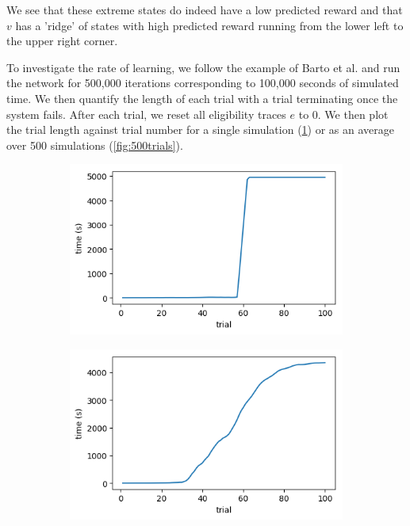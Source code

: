 \documentclass{article}
\begin{document}
We see that these extreme states do indeed have a low predicted reward and that $v$ has a 'ridge' of states with high predicted reward running from the lower left to the upper right corner.

To investigate the rate of learning, we follow the example of Barto et al. and run the network for 500,000 iterations corresponding to 100,000 seconds of simulated time. We then quantify the length of each trial with a trial terminating once the system fails. After each trial, we reset all eligibility traces $e$ to 0. We then plot the trial length against trial number for a single simulation (\ref{fig:singletrial}) or as an average over 500 simulations (\ref{fig:500trials}).

\begin{figure}[h]
	\centering
	\begin{subfigure}[t]{0.28\linewidth}
		\centering
		\includegraphics[width = 1.0\linewidth, trim={0 0 0 0}, clip=true]{figures/learn500000_performance.png}
		\label{fig:singletrial}	
	\end{subfigure}%
	\hspace{0.1\linewidth}
	\begin{subfigure}[t]{0.28\linewidth}
		\centering
		\includegraphics[width = 1.0\linewidth, trim={0 0 0 0}, clip=true]{figures/real_meanperformance.png}

\end{subfigure}
\end{figure}
\end{document}
